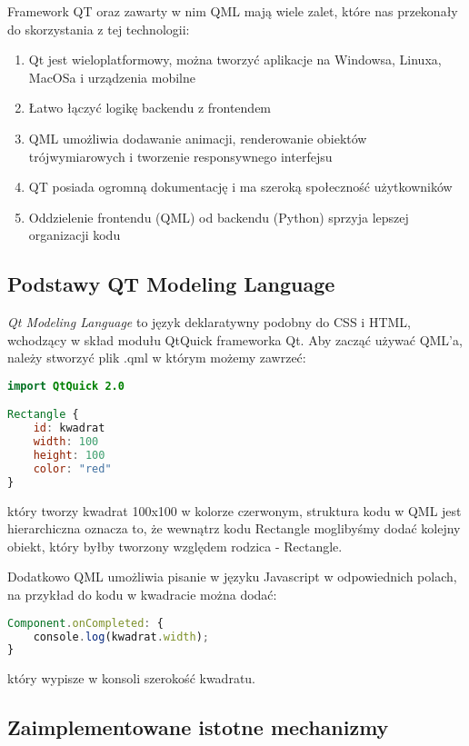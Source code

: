 Framework QT oraz zawarty w nim QML mają wiele zalet, które nas przekonały do skorzystania z tej technologii:
\begin{enumerate}
    \item Qt jest wieloplatformowy, można tworzyć aplikacje na Windowsa, Linuxa, MacOSa i urządzenia mobilne
    \item Łatwo łączyć logikę backendu z frontendem
    \item QML umożliwia dodawanie animacji, renderowanie obiektów trójwymiarowych i tworzenie responsywnego interfejsu
    \item QT posiada ogromną dokumentację i ma szeroką społeczność użytkowników
    \item Oddzielenie frontendu (QML) od backendu (Python) sprzyja lepszej organizacji kodu
\end{enumerate}

\subsection{Podstawy QT Modeling Language} 
\label{sec:PodstawyQtModelingLanguage}
\emph{Qt Modeling Language} to język deklaratywny podobny do CSS i HTML, wchodzący w skład modułu QtQuick frameworka Qt. Aby zacząć używać QML'a, należy stworzyć plik .qml w którym możemy zawrzeć:

\begin{lstlisting}[language=QML, caption={Przykładowy kod QML}]
import QtQuick 2.0

Rectangle {
    id: kwadrat
    width: 100
    height: 100
    color: "red"
}
\end{lstlisting}
który tworzy kwadrat 100x100 w kolorze czerwonym, struktura kodu w QML jest hierarchiczna oznacza to, że wewnątrz kodu Rectangle moglibyśmy dodać kolejny obiekt, który byłby tworzony względem rodzica - Rectangle.

Dodatkowo QML umożliwia pisanie w języku Javascript w odpowiednich polach,
na przykład do kodu w kwadracie można dodać:

\begin{lstlisting}[language=QML, caption={Przykładowy Javascript}]
Component.onCompleted: {
    console.log(kwadrat.width);
}
\end{lstlisting}
który wypisze w konsoli szerokość kwadratu.


\subsection{Zaimplementowane istotne mechanizmy}
\label{sec:ZaimplementowaneIstotneMechanizmy}

